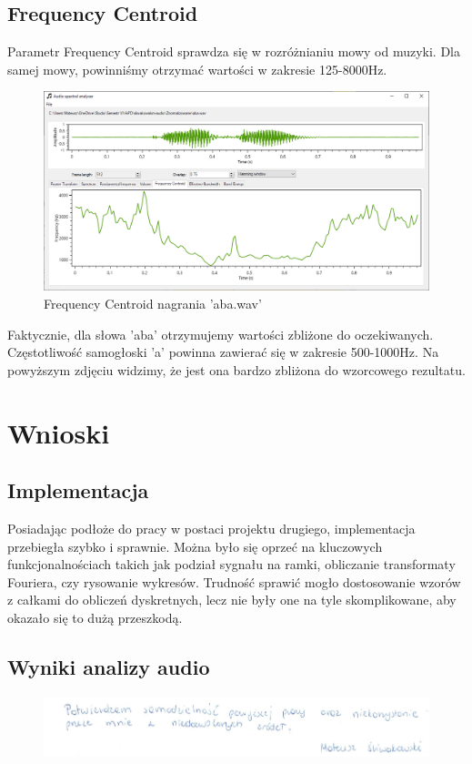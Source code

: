 \documentclass{article}
\begin{document}
\subsection{Frequency Centroid}
Parametr Frequency Centroid sprawdza się w rozróżnianiu mowy od muzyki. Dla samej mowy, powinniśmy otrzymać wartości w zakresie 125-8000Hz. 

\begin{figure}[H]
\includegraphics[width=6in]{scr4.png}
\centering
\caption{Frequency Centroid nagrania 'aba.wav'}
\end{figure}

\noindent Faktycznie, dla słowa 'aba' otrzymujemy wartości zbliżone do oczekiwanych. Częstotliwość samogłoski 'a' powinna zawierać się w zakresie 500-1000Hz. Na powyższym zdjęciu widzimy, że jest ona bardzo zbliżona do wzorcowego rezultatu. 

\section{Wnioski}
\subsection{Implementacja}
Posiadając podłoże do pracy w postaci projektu drugiego, implementacja przebiegła szybko i sprawnie. Można było się oprzeć na kluczowych funkcjonalnościach takich jak podział sygnału na ramki, obliczanie transformaty Fouriera, czy rysowanie wykresów. Trudność sprawić mogło dostosowanie wzorów z całkami do obliczeń dyskretnych, lecz nie były one na tyle skomplikowane, aby okazało się to dużą przeszkodą.

\subsection{Wyniki analizy audio}


\begin{figure}[b]
\centering
\includegraphics[width=5in]{bottom.png}
\end{figure}
\end{document}
